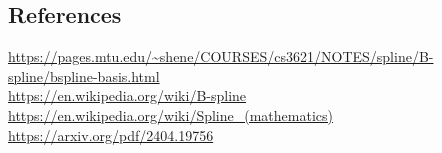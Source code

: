 \documentclass{article}
\begin{document}
\subsection{References}
\url{https://pages.mtu.edu/~shene/COURSES/cs3621/NOTES/spline/B-spline/bspline-basis.html}\\
\url{https://en.wikipedia.org/wiki/B-spline}\\
\url{https://en.wikipedia.org/wiki/Spline_(mathematics)}\\
\url{https://arxiv.org/pdf/2404.19756}
\end{document}
